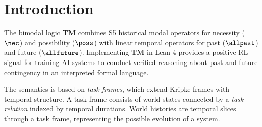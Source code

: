 \documentclass[../BimodalReference.tex]{subfiles}
\begin{document}
\section{Introduction}

The bimodal logic \textbf{TM} combines S5 historical modal operators for necessity ($\nec$) and possibility ($\poss$) with linear temporal operators for past ($\allpast$) and future ($\allfuture$).
Implementing \textbf{TM} in Lean 4 provides a positive RL signal for training AI systems to conduct verified reasoning about past and future contingency in an interpreted formal language.

The semantics is based on \emph{task frames}, which extend Kripke frames with temporal structure.
A task frame consists of world states connected by a \emph{task relation} indexed by temporal durations.
World histories are temporal slices through a task frame, representing the possible evolution of a system.
\end{document}
